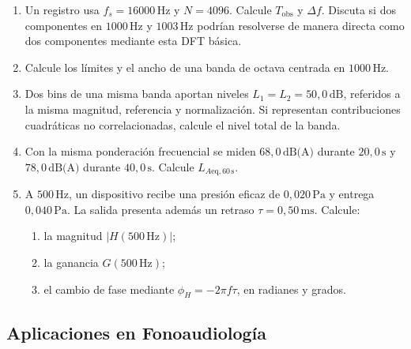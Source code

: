 \begin{enumerate}[label=\textbf{A\arabic*.},leftmargin=*]
    \item Un registro usa \(f_s=16000\,\text{Hz}\) y \(N=4096\).
    Calcule \(T_\mathrm{obs}\) y \(\Delta f\). Discuta si dos componentes en
    \(1000\,\text{Hz}\) y \(1003\,\text{Hz}\) podrían resolverse de manera
    directa como dos componentes mediante esta DFT básica.

    \item Calcule los límites y el ancho de una banda de octava centrada en
    \(1000\,\text{Hz}\).

    \item Dos bins de una misma banda aportan niveles
    \(L_1=L_2=50{,}0\,\text{dB}\), referidos a la misma magnitud, referencia y
    normalización. Si representan contribuciones cuadráticas no
    correlacionadas, calcule el nivel total de la banda.

    \item Con la misma ponderación frecuencial se miden
    \(68{,}0\,\text{dB(A)}\) durante \(20{,}0\,\text{s}\) y
    \(78{,}0\,\text{dB(A)}\) durante \(40{,}0\,\text{s}\). Calcule
    \(L_{A\mathrm{eq},60\,\mathrm{s}}\).

    \item A \(500\,\text{Hz}\), un dispositivo recibe una presión eficaz de
    \(0{,}020\,\text{Pa}\) y entrega \(0{,}040\,\text{Pa}\). La salida presenta
    además un retraso \(\tau=0{,}50\,\text{ms}\). Calcule:
    \begin{enumerate}[label=\alph*)]
        \item la magnitud \(\lvert H(500\,\text{Hz})\rvert\);
        \item la ganancia \(G(500\,\text{Hz})\);
        \item el cambio de fase mediante
        \(\phi_H=-2\pi f\tau\), en radianes y grados.
    \end{enumerate}
\end{enumerate}

\subsection*{Aplicaciones en Fonoaudiología}

